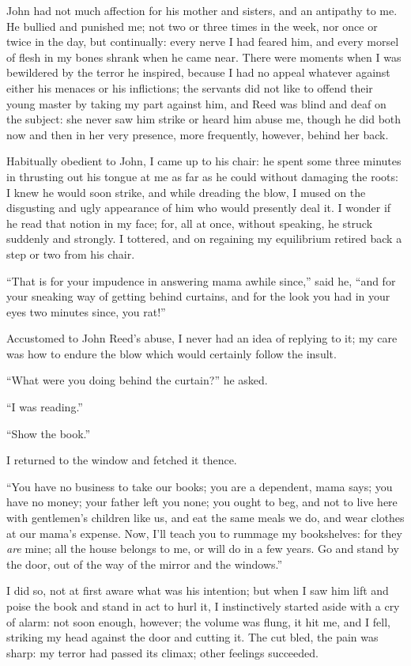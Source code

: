 John had not much affection for his mother and sisters, and an antipathy
to me. He bullied and punished me; not two or three times in the week,
nor once or twice in the day, but continually: every nerve I had feared
him, and every morsel of flesh in my bones shrank when he came near. 
There were moments when I was bewildered by the terror he inspired,
because I had no appeal whatever against either his menaces or his
inflictions; the servants did not like to offend their young master by
taking my part against him, and \Mrs{} Reed was blind and deaf on the
subject: she never saw him strike or heard him abuse me, though he did
both now and then in her very presence, more frequently, however, behind
her back.

Habitually obedient to John, I came up to his chair: he spent some three
minutes in thrusting out his tongue at me as far as he could without
damaging the roots: I knew he would soon strike, and while dreading the
blow, I mused on the disgusting and ugly appearance of him who would
presently deal it. I wonder if he read that notion in my face; for, all
at once, without speaking, he struck suddenly and strongly. I tottered,
and on regaining my equilibrium retired back a step or two from his
chair.

\enquote{That is for your impudence in answering mama awhile since,}
said he, \enquote{and for your sneaking way of getting behind curtains,
and for the look you had in your eyes two minutes since, you rat!}

Accustomed to John Reed's abuse, I never had an idea of replying to it;
my care was how to endure the blow which would certainly follow the
insult.

\enquote{What were you doing behind the curtain?} he asked.

\enquote{I was reading.}

\enquote{Show the book.}

I returned to the window and fetched it thence.

\enquote{You have no business to take our books; you are a dependent, mama
says; you have no money; your father left you none; you ought to beg,
and not to live here with gentlemen's children like us, and eat the same
meals we do, and wear clothes at our mama's expense. Now, I'll teach
you to rummage my bookshelves: for they \emph{are} mine; all the house
belongs to me, or will do in a few years. Go and stand by the door, out
of the way of the mirror and the windows.}

I did so, not at first aware what was his intention; but when I saw him
lift and poise the book and stand in act to hurl it, I instinctively
started aside with a cry of alarm: not soon enough, however; the volume
was flung, it hit me, and I fell, striking my head against the door and
cutting it. The cut bled, the pain was sharp: my terror had passed its
climax; other feelings succeeded.

